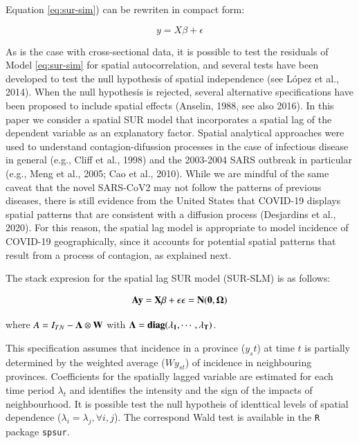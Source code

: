 \documentclass[]{elsarticle} %
\begin{document}
Equation \ref{eq:sur-sim}) can be rewriten in compact form:

\begin{equation}
y = X \beta + \epsilon
\end{equation}

As is the case with cross-sectional data, it is possible to test the
residuals of Model \ref{eq:sur-sim} for spatial autocorrelation, and
several tests have been developed to test the null hypothesis of spatial
independence (see López et al., 2014). When the null hypothesis is
rejected, several alternative specifications have been proposed to
include spatial effects (Anselin, 1988, see also 2016). In this paper we
consider a spatial SUR model that incorporates a spatial lag of the
dependent variable as an explanatory factor. Spatial analytical
approaches were used to understand contagion-difussion processes in the
case of infectious disease in general (e.g., Cliff et al., 1998) and the
2003-2004 SARS outbreak in particular (e.g., Meng et al., 2005; Cao et
al., 2010). While we are mindful of the same caveat that the novel
SARS-CoV2 may not follow the patterns of previous diseases, there is
still evidence from the United States that COVID-19 displays spatial
patterns that are consistent with a diffusion process (Desjardins et
al., 2020). For this reason, the spatial lag model is appropriate to
model incidence of COVID-19 geographically, since it accounts for
potential spatial patterns that result from a process of contagion, as
explained next.

The stack expresion for the spatial lag SUR model (SUR-SLM) is as
follows:

\begin{equation}
\label{eq:sur-slm}
\bf{A}y = X \beta + \epsilon \\
\epsilon =N(0,\Omega)
\end{equation}

\noindent where \(A =I_{TN}-\bf{\Lambda} \otimes W\) with
\(\bf{\Lambda} = diag(\lambda_1, \cdots, \lambda_T)\).

This specification assumes that incidence in a province (\(y_st\)) at
time \(t\) is partially determined by the weighted average (\(Wy_{st}\))
of incidence in neighbouring provinces. Coefficients for the spatially
lagged variable are estimated for each time period \(\lambda_t\) and
identifies the intensity and the sign of the impacts of neighbourhood.
It is possible test the null hypotheis of identtical levels of spatial
dependence (\(\lambda_i=\lambda_j, \forall i,j\)). The correspond Wald
test is available in the \texttt{R} package \texttt{spsur}.
\end{document}
